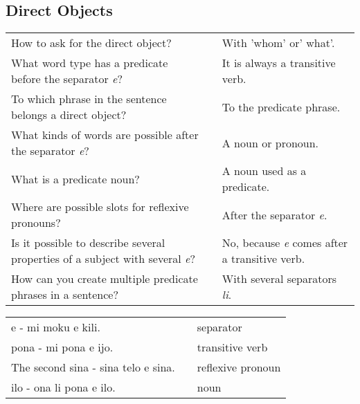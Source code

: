 \newpage
%
\subsection*{Direct Objects}
\label{'direct_objects_compund_sentences'}
%
\begin{supertabular}{p{5,5cm}|ll}
    How to ask for the direct object?                                                   &  & With 'whom' or' what'.                                \\ %
    What word type has a predicate before the separator \textit{e}?                     &  & It is always a transitive verb.                       \\ %
    To which phrase in the sentence belongs a direct object?                            &  & To the predicate phrase.                              \\ %
    What kinds of words are possible after the separator \textit{e}?                    &  & A noun or pronoun.                                    \\ %
    What is a predicate noun?                                                           &  & A noun used as a predicate.                           \\ %
    Where are possible slots for reflexive pronouns?                                    &  & After the separator \textit{e}.                       \\ %
    Is it possible to describe several properties of a subject with several \textit{e}? &  & No, because \textit{e} comes after a transitive verb. \\ %
    How can you create multiple predicate phrases in a sentence?                        &  & With several separators \textit{li}.                  \\ %
\end{supertabular}

\begin{supertabular}{p{5,5cm}|ll}
    e - mi moku e kili.                 &  & separator         \\ %
    pona - mi pona e ijo.               &  & transitive verb   \\ %
    The second sina - sina telo e sina. &  & reflexive pronoun \\ %
    ilo - ona li pona e ilo.            &  & noun              \\ %
\end{supertabular}

